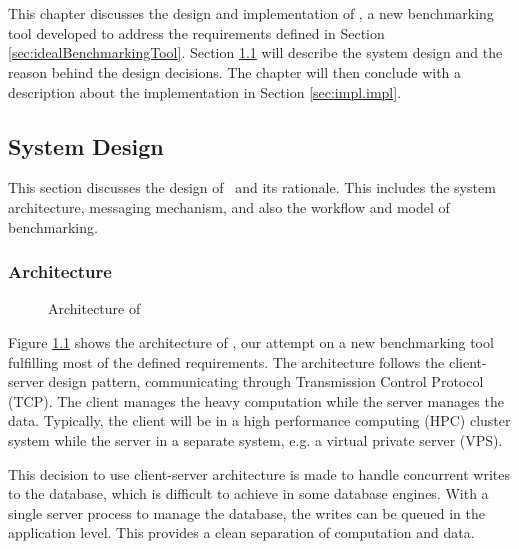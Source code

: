 \chapter{\chImplementation}
\label{ch:implementation}

This chapter discusses the design and implementation of \OurBenchmarkingTool, a new benchmarking tool developed to address the requirements defined in Section \ref{sec:idealBenchmarkingTool}.
Section \ref{sec:impl.design} will describe the system design and the reason behind the design decisions.
The chapter will then conclude with a description about the implementation in Section \ref{sec:impl.impl}.

\section{System Design}
\label{sec:impl.design}

This section discusses the design of \OurBenchmarkingTool~and its rationale.
This includes the system architecture, messaging mechanism, and also the workflow and model of benchmarking.

\subsection{Architecture}
\label{sec:impl.architecture}

\begin{figure}
    \centering
    \caption{Architecture of \OurBenchmarkingTool}
    \label{fig:architecture}
\end{figure}

Figure \ref{fig:architecture} shows the architecture of \OurBenchmarkingTool, our attempt on a new benchmarking tool fulfilling most of the defined requirements.
The architecture follows the client-server design pattern, communicating through Transmission Control Protocol (TCP).
The client manages the heavy computation while the server manages the data.
Typically, the client will be in a high performance computing (HPC) cluster system while the server in a separate system, e.g. a virtual private server (VPS).

This decision to use client-server architecture is made to handle concurrent writes to the database, which is difficult to achieve in some database engines.
With a single server process to manage the database, the writes can be queued in the application level.
This provides a clean separation of computation and data.

